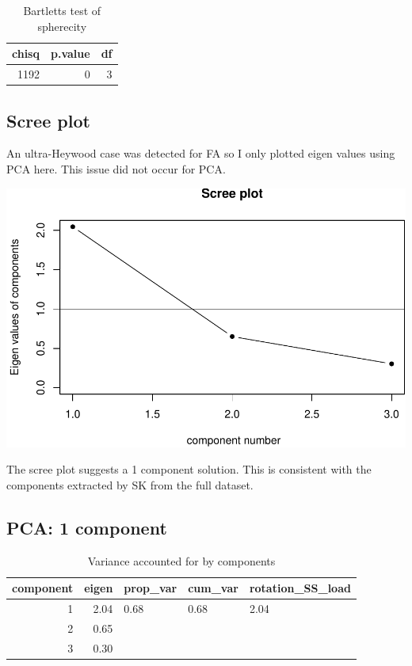 \documentclass[]{article}
\begin{document}
\begin{table}[H]

\caption{\label{tab:unnamed-chunk-34}Bartletts test of spherecity}
\centering
\fontsize{6}{8}\selectfont
\begin{tabular}[t]{rrr}
\toprule
chisq & p.value & df\\
\midrule
1192 & 0 & 3\\
\bottomrule
\end{tabular}
\end{table}

\hypertarget{scree-plot-6}{%
\subsection{Scree plot}\label{scree-plot-6}}

An ultra-Heywood case was detected for FA so I only plotted eigen values
using PCA here. This issue did not occur for PCA.

\includegraphics{PCA_covid_files/figure-latex/unnamed-chunk-35-1.pdf}

The scree plot suggests a 1 component solution. This is consistent with
the components extracted by SK from the full dataset.

\hypertarget{pca-1-component-3}{%
\subsection{PCA: 1 component}\label{pca-1-component-3}}

\begin{table}[H]

\caption{\label{tab:unnamed-chunk-36}Variance accounted for by components}
\centering
\fontsize{6}{8}\selectfont
\begin{tabular}[t]{rrlll}
\toprule
component & eigen & prop\_var & cum\_var & rotation\_SS\_load\\
\midrule
1 & 2.04 & 0.68 & 0.68 & 2.04\\
2 & 0.65 &  &  & \\
3 & 0.30 &  &  & \\
\bottomrule
\end{tabular}
\end{table}
\end{document}

